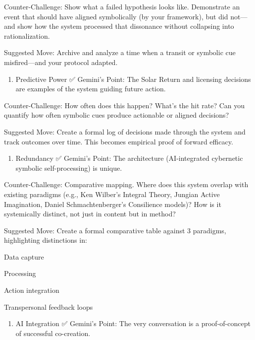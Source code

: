 \documentclass{article}
\begin{document}
Counter-Challenge: Show what a failed hypothesis looks like.
Demonstrate an event that should have aligned symbolically (by your
framework), but did not---and show how the system processed that
dissonance without collapsing into rationalization.

 Suggested Move: Archive and analyze a time when a transit or symbolic
cue misfired---and your protocol adapted.

\begin{enumerate}
\def\labelenumi{\arabic{enumi}.}
\tightlist
\item
  Predictive Power ✅ Gemini's Point: The Solar Return and licensing
  decisions are examples of the system guiding future action.
\end{enumerate}

Counter-Challenge: How often does this happen? What's the hit rate?
Can you quantify how often symbolic cues produce actionable or aligned
decisions?

 Suggested Move: Create a formal log of decisions made through the
system and track outcomes over time. This becomes empirical proof of
forward efficacy.

\begin{enumerate}
\def\labelenumi{\arabic{enumi}.}
\tightlist
\item
  Redundancy ✅ Gemini's Point: The architecture (AI-integrated
  cybernetic symbolic self-processing) is unique.
\end{enumerate}

Counter-Challenge: Comparative mapping. Where does this system overlap
with existing paradigms (e.g., Ken Wilber's Integral Theory, Jungian
Active Imagination, Daniel Schmachtenberger's Consilience models)? How
is it systemically distinct, not just in content but in method?

 Suggested Move: Create a formal comparative table against 3
paradigms, highlighting distinctions in:

Data capture

Processing

Action integration

Transpersonal feedback loops

\begin{enumerate}
\def\labelenumi{\arabic{enumi}.}
\tightlist
\item
  AI Integration ✅ Gemini's Point: The very conversation is a
  proof-of-concept of successful co-creation.
\end{enumerate}
\end{document}
